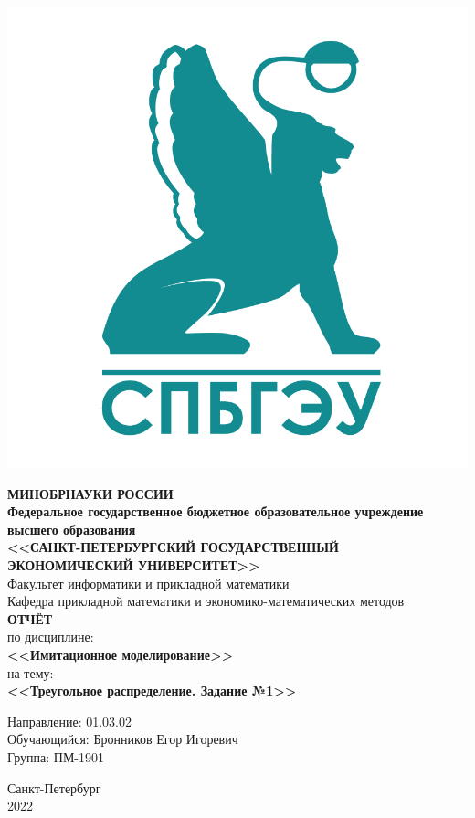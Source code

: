 \documentclass[14pt,fleqn]{extarticle}
\begin{document}
	\begin{titlepage}
		\includegraphics[scale=0.12]{logo}
		\begin{center}
			\textbf{МИНОБРНАУКИ РОССИИ}\\
			\vspace{0.2cm}
			\textbf{Федеральное государственное бюджетное образовательное учреждение высшего образования}\\
			\textbf{<<САНКТ-ПЕТЕРБУРГСКИЙ ГОСУДАРСТВЕННЫЙ ЭКОНОМИЧЕСКИЙ УНИВЕРСИТЕТ>>}\\
			\vspace{0.6cm}
			Факультет информатики и прикладной математики\\
			Кафедра прикладной математики и экономико-математических методов\\
			\vspace{1cm}
			\textbf{ОТЧЁТ}\\
			по дисциплине:\\
			\textbf{<<Имитационное моделирование>>}\\
			на тему:\\
			\textbf{<<Треугольное распределение. Задание №1>>}\\
		\end{center}
		\vspace{1cm}
		Направление: 01.03.02\\
		Обучающийся: Бронников Егор Игоревич\\
		Группа: ПМ-1901\\
		\vfill
		\begin{center}
			Санкт-Петербург\\
			2022\\
		\end{center}
	\end{titlepage}
\end{document}
